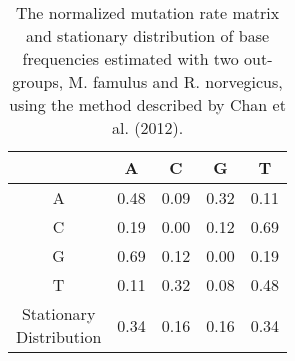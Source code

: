 \begin{table}
\caption{The normalized mutation rate matrix and stationary distribution of base frequencies estimated with two out-groups, M. famulus and R. norvegicus, using the method described by Chan et al. (2012).}
	\begin{tabular} {c c c c c} \\ [ 0.5ex ] \hline
 & A & C & G & T \\ \hline
A & 0.48 & 0.09 & 0.32 & 0.11 \\
C & 0.19 & 0.00 & 0.12 & 0.69 \\
G & 0.69 & 0.12 & 0.00 & 0.19 \\
T & 0.11 & 0.32 & 0.08 & 0.48 \\ \hline
\makecell{Stationary \\ Distribution} & 0.34 & 0.16 & 0.16 & 0.34 \\ \hline

\end{tabular}
 \label{tab:C2ST2}
\end{table}
